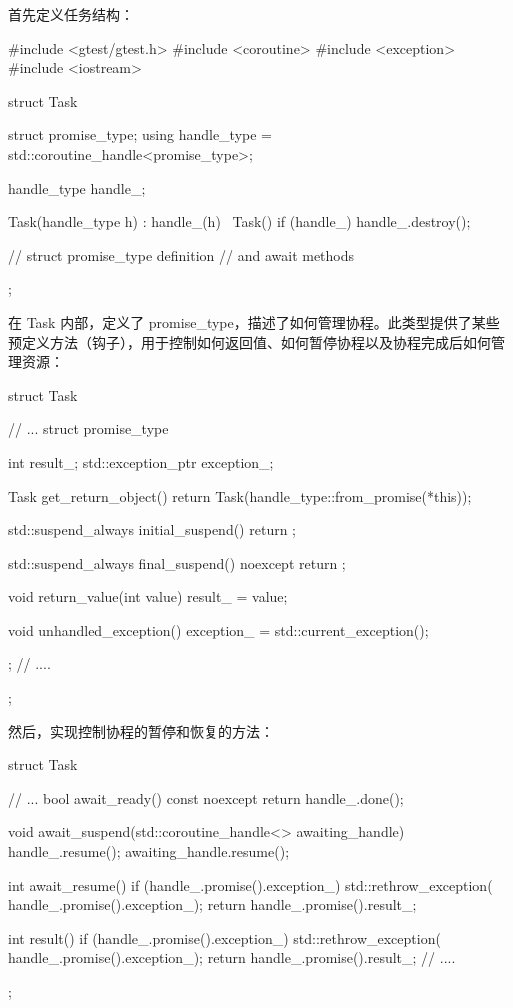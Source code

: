 首先定义任务结构：

\begin{cpp}
#include <gtest/gtest.h>
#include <coroutine>
#include <exception>
#include <iostream>

struct Task {
    struct promise_type;
    using handle_type =
                std::coroutine_handle<promise_type>;

    handle_type handle_;

    Task(handle_type h) : handle_(h) {}
    ~Task() {
        if (handle_) handle_.destroy();
    }

    // struct promise_type definition
    // and await methods
};
\end{cpp}

在 Task 内部，定义了 promise\_type，描述了如何管理协程。此类型提供了某些预定义方法（钩子），用于控制如何返回值、如何暂停协程以及协程完成后如何管理资源：

\begin{cpp}
struct Task {
    // ...
    struct promise_type {
        int result_;
        std::exception_ptr exception_;

        Task get_return_object() {
            return Task(handle_type::from_promise(*this));
        }

        std::suspend_always initial_suspend() {
            return {};
        }

        std::suspend_always final_suspend() noexcept {
            return {};
        }

        void return_value(int value) {
            result_ = value;
        }

        void unhandled_exception() {
            exception_ = std::current_exception();
        }
    };
    // ....
};
\end{cpp}

然后，实现控制协程的暂停和恢复的方法：

\begin{cpp}
struct Task {
    // ...
    bool await_ready() const noexcept {
        return handle_.done();
    }

    void await_suspend(std::coroutine_handle<>
                            awaiting_handle) {
        handle_.resume();
        awaiting_handle.resume();
    }

    int await_resume() {
        if (handle_.promise().exception_) {
            std::rethrow_exception(
            handle_.promise().exception_);
        }
        return handle_.promise().result_;
    }

    int result() {
        if (handle_.promise().exception_) {
            std::rethrow_exception(
            handle_.promise().exception_);
        }
        return handle_.promise().result_;
    }
    // ....
};
\end{cpp}

